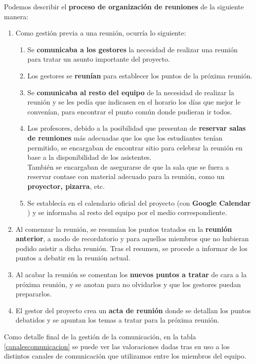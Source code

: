 Podemos describir el \textbf{proceso de organización de reuniones} de la siguiente manera:

\begin{enumerate}
    \item Como gestión previa a una reunión, ocurría lo siguiente:
    \begin{enumerate}
        \item Se \textbf{comunicaba a los gestores} la necesidad de realizar una reunión para tratar un asunto importante del proyecto.
        \item Los gestores se \textbf{reunían} para establecer los puntos de la próxima reunión.
        \item Se \textbf{comunicaba al resto del equipo} de la necesidad de realizar la reunión y se les pedía que indicasen en el horario los días que mejor le convenían, para encontrar el punto común donde pudieran ir todos.
        \item Los profesores, debido a la posibilidad que presentan de \textbf{reservar salas de reuniones} más adecuadas que los que los estudiantes tenían permitido, se encargaban de encontrar sitio para celebrar la reunión en base a la disponibilidad de los asistentes.\\
        También se encargaban de asegurarse de que la sala que se fuera a reservar contase con material adecuado para la reunión, como un \textbf{proyector, pizarra}, etc.
        \item Se establecía en el calendario oficial del proyecto (con \textbf{Google Calendar} \cite{googlecalendar}) y se informaba al resto del equipo por el medio correspondiente.
    \end{enumerate}
    \item Al comenzar la reunión, se resumían los puntos tratados en la \textbf{reunión anterior}, a modo de recordatorio y para aquellos miembros que no hubieran podido asistir a dicha reunión. Tras el resumen, se procede a informar de los puntos a debatir en la reunión actual.
    \item Al acabar la reunión se comentan los \textbf{nuevos puntos a tratar} de cara a la próxima reunión, y se anotan para no olvidarlos y que los gestores puedan prepararlos.
    \item El gestor del proyecto crea un \textbf{acta de reunión} donde se detallan los puntos debatidos y se apuntan los temas a tratar para la próxima reunión.
\end{enumerate}

Como detalle final de la gestión de la comunicación, en la tabla \ref{canalescomunicacion} se puede ver las valoraciones dadas tras su uso a los distintos canales de comunicación que utilizamos entre los miembros del equipo.

